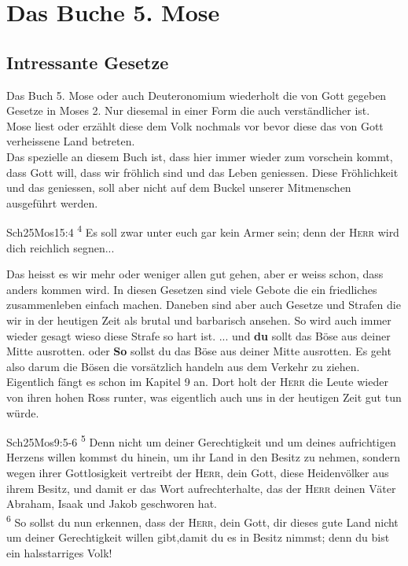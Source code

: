 \section{Das Buche 5. Mose}
\subsection{Intressante Gesetze}

Das Buch 5. Mose oder auch Deuteronomium wiederholt die von Gott gegeben Gesetze in Moses 2. Nur diesemal in einer Form die auch verständlicher ist.\\
Mose liest oder erzählt diese dem Volk nochmals vor bevor diese das von Gott verheissene Land betreten.\\
Das spezielle an diesem Buch ist, dass hier immer wieder zum vorschein kommt, dass Gott will, dass wir fröhlich sind und das Leben geniessen. Diese Fröhlichkeit und das geniessen, soll aber nicht auf dem Buckel unserer Mitmenschen ausgeführt werden. \\
\begin{bibeltext}{Sch2}{5Mos}{15:4}
	\textsuperscript{4} Es soll zwar unter euch gar kein Armer sein; denn der \textsc{Herr} wird dich reichlich segnen...
\end{bibeltext}
Das heisst es wir mehr oder weniger allen gut gehen, aber er weiss schon, dass anders kommen wird. In diesen Gesetzen sind viele Gebote die ein friedliches zusammenleben einfach machen. Daneben sind aber auch Gesetze und Strafen die wir in der heutigen Zeit als brutal und barbarisch ansehen. So wird auch immer wieder gesagt wieso diese Strafe so hart ist. \flqq ... und \textbf{du} sollt das Böse aus deiner Mitte ausrotten.\frqq{} oder \flqq \textbf{So} sollst du das Böse aus deiner Mitte ausrotten.\frqq{}
Es geht also darum die Bösen die vorsätzlich handeln aus dem Verkehr zu ziehen.\\
Eigentlich fängt es schon im Kapitel 9 an. Dort holt der \textsc{Herr} die Leute wieder von ihren hohen Ross runter, was eigentlich auch uns in der heutigen Zeit gut tun würde.
\begin{bibeltext}{Sch2}{5Mos}{9:5-6}
    \textsuperscript{5} Denn nicht um deiner Gerechtigkeit und um deines aufrichtigen Herzens willen kommst du hinein, um ihr Land in den Besitz zu nehmen, sondern wegen ihrer Gottlosigkeit vertreibt der \textsc{Herr}, dein Gott, diese Heidenvölker aus ihrem Besitz, und damit er das Wort aufrechterhalte, das der \textsc{Herr} deinen Väter Abraham, Isaak und Jakob geschworen hat.\\
    \textsuperscript{6} So sollst du nun erkennen, dass der \textsc{Herr}, dein Gott, dir dieses gute Land nicht um deiner Gerechtigkeit willen gibt,damit du es in Besitz nimmst; denn du bist ein halsstarriges Volk!
\end{bibeltext}
